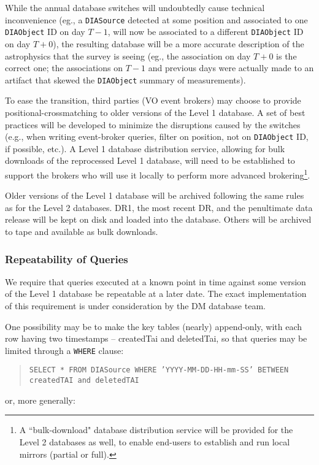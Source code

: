 \documentclass[12pt]{article}
\newcommand{\code}[1]{\texttt{#1}}
\newcommand{\DIASource}{\code{DIASource}\xspace}
\newcommand{\DIAObject}{\code{DIAObject}\xspace}
\newcommand{\DB}{{Level 1 database}\xspace}
\newcommand{\DR}{{Level 2 database}\xspace}
\begin{document}
While the annual database switches will undoubtedly cause technical inconvenience (eg., a \DIASource detected at some position and associated to one \DIAObject ID on day $T-1$, will now be associated to a different \DIAObject ID on day $T+0$), the resulting database will be a more accurate description of the astrophysics that the survey is seeing (eg., the association on day $T+0$ is the correct one; the associations on $T-1$ and previous days were actually made to an artifact that skewed the \DIAObject summary of measurements).

To ease the transition, third parties (VO event brokers) may choose to provide positional-crossmatching to older versions of the \DB. A set of best practices will be developed to minimize the disruptions caused by the switches (e.g., when writing event-broker queries, filter on position, not on \DIAObject ID, if possible, etc.). A \DB distribution service, allowing for bulk downloads of the reprocessed \DB, will need to be established to support the brokers who will use it locally to perform more advanced brokering\footnote{A ``bulk-download" database distribution service will be provided for the \DR{}s as well, to enable end-users to establish and run local mirrors (partial or full).}.

Older versions of the \DB will be archived following the same rules as for the \DR{}s. DR1, the most recent DR, and the penultimate data release will be kept on disk and loaded into the database. Others will be archived to tape and available as bulk downloads.

\subsubsection{Repeatability of Queries}

We require that queries executed at a known point in time against some version of the \DB be repeatable at a later date. The exact implementation of this requirement is under consideration by the DM database team.

One possibility may be to make the key tables (nearly) append-only, with each row having two timestamps -- createdTai and deletedTai, so that queries may be limited through a \code{WHERE} clause:

\begin{quote}
\texttt{SELECT * FROM DIASource WHERE 'YYYY-MM-DD-HH-mm-SS' BETWEEN createdTAI and deletedTAI}
\end{quote}

or, more generally:
\end{document}
